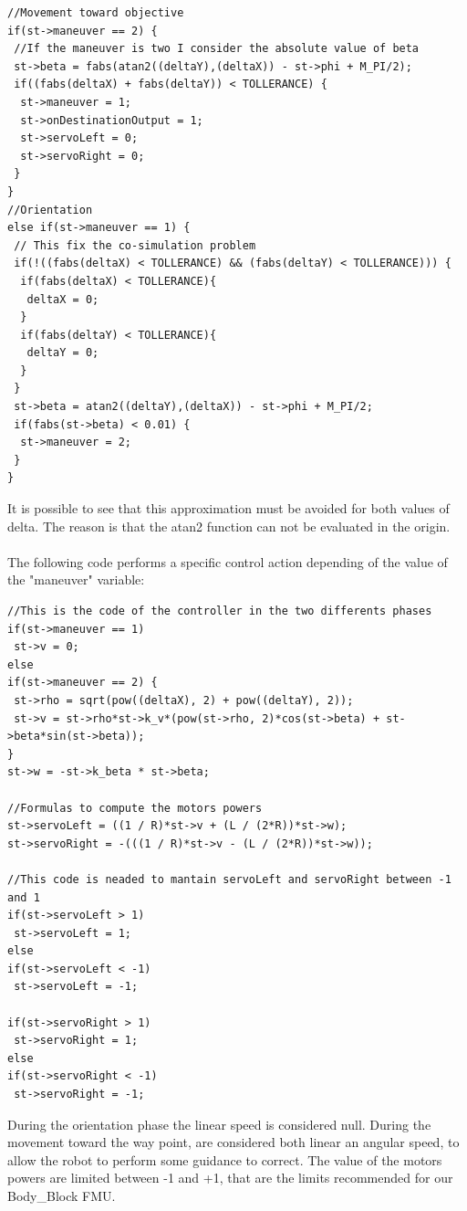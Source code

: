 \documentclass[english]{article}
\begin{document}
\begin{lstlisting}
//Movement toward objective
if(st->maneuver == 2) {
 //If the maneuver is two I consider the absolute value of beta
 st->beta = fabs(atan2((deltaY),(deltaX)) - st->phi + M_PI/2);
 if((fabs(deltaX) + fabs(deltaY)) < TOLLERANCE) {
  st->maneuver = 1;
  st->onDestinationOutput = 1;
  st->servoLeft = 0;
  st->servoRight = 0;
 }
}
//Orientation 
else if(st->maneuver == 1) {
 // This fix the co-simulation problem
 if(!((fabs(deltaX) < TOLLERANCE) && (fabs(deltaY) < TOLLERANCE))) {
  if(fabs(deltaX) < TOLLERANCE){
   deltaX = 0;
  }
  if(fabs(deltaY) < TOLLERANCE){
   deltaY = 0;
  }
 }
 st->beta = atan2((deltaY),(deltaX)) - st->phi + M_PI/2;
 if(fabs(st->beta) < 0.01) {
  st->maneuver = 2;
 }
}
\end{lstlisting} 

\noindent It is possible to see that this approximation must be avoided for both values of delta. The reason is that the atan2 function can not be evaluated in the origin.\\
\\The following code performs a specific control action depending of the value of the "maneuver" variable:  

\begin{lstlisting}
//This is the code of the controller in the two differents phases
if(st->maneuver == 1) 
 st->v = 0;
else
if(st->maneuver == 2) {
 st->rho = sqrt(pow((deltaX), 2) + pow((deltaY), 2));
 st->v = st->rho*st->k_v*(pow(st->rho, 2)*cos(st->beta) + st->beta*sin(st->beta));
}
st->w = -st->k_beta * st->beta;

//Formulas to compute the motors powers
st->servoLeft = ((1 / R)*st->v + (L / (2*R))*st->w);
st->servoRight = -(((1 / R)*st->v - (L / (2*R))*st->w));

//This code is neaded to mantain servoLeft and servoRight between -1 and 1
if(st->servoLeft > 1)
 st->servoLeft = 1;
else
if(st->servoLeft < -1)
 st->servoLeft = -1;

if(st->servoRight > 1)
 st->servoRight = 1;
else
if(st->servoRight < -1)
 st->servoRight = -1;
\end{lstlisting}

\noindent During the orientation phase the linear speed is considered null. During the movement toward the way point, are considered both linear an angular speed, to allow the robot to perform some guidance to correct. The value of the motors powers are limited between -1 and +1, that are the limits recommended for our Body\_Block FMU.
\end{document}
